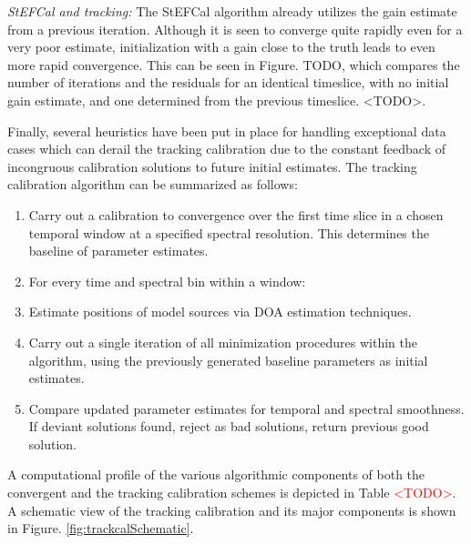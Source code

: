 \documentclass{aa}
\begin{document}
\emph{StEFCal and tracking: }The StEFCal algorithm already utilizes
the gain estimate from a previous iteration. Although it is seen to
converge quite rapidly even for a very poor estimate, initialization
with a gain close to the truth leads to even more rapid convergence.
This can be seen in Figure. TODO, which compares the number of iterations
and the residuals for an identical timeslice, with no initial gain
estimate, and one determined from the previous timeslice. <TODO>.

Finally, several heuristics have been put in place for handling exceptional
data cases which can derail the tracking calibration due to the constant
feedback of incongruous calibration solutions to future initial estimates.
The tracking calibration algorithm can be summarized as follows:
\begin{enumerate}
\item Carry out a calibration to convergence over the first time slice in
a chosen temporal window at a specified spectral resolution. This
determines the baseline of parameter estimates.
\item For every time and spectral bin within a window:
\item Estimate positions of model sources via DOA estimation techniques.
\item Carry out a single iteration of all minimization procedures within
the algorithm, using the previously generated baseline parameters
as initial estimates.
\item Compare updated parameter estimates for temporal and spectral smoothness.
If deviant solutions found, reject as bad solutions, return previous
good solution.
\end{enumerate}
A computational profile of the various algorithmic components of both
the convergent and the tracking calibration schemes is depicted in
Table \textcolor{red}{<TODO>}. A schematic view of the tracking calibration
and its major components is shown in Figure. \textcolor{black}{\ref{fig:trackcalSchematic}.}
\end{document}
